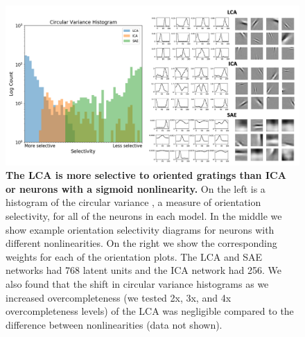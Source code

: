 \begin{figure}[h]
    \centering
    \includegraphics[width=\textwidth]{figures/circular_variance_histogram.png}
    \caption{\textbf{The LCA is more selective to oriented gratings than ICA or neurons with a sigmoid nonlinearity.} On the left is a histogram of the circular variance \parencite{ringach2002orientation}, a measure of orientation selectivity, for all of the neurons in each model. In the middle we show example orientation selectivity diagrams for neurons with different nonlinearities. On the right we show the corresponding weights for each of the orientation plots. The LCA and SAE networks had 768 latent units and the ICA network had 256. We also found that the shift in circular variance histograms as we increased overcompleteness (we tested 2x, 3x, and 4x overcompleteness levels) of the LCA was negligible compared to the difference between nonlinearities (data not shown).}
    \label{fig:ch4_orientation_selectivity}
\end{figure}

